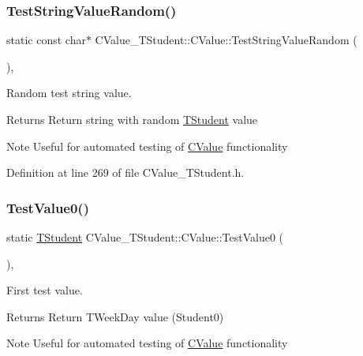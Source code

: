 \subsubsection{\texorpdfstring{Test\+String\+Value\+Random()}{TestStringValueRandom()}}
{\footnotesize\ttfamily static const char$\ast$ C\+Value\+\_\+\+T\+Student\+::\+C\+Value\+::\+Test\+String\+Value\+Random (\begin{DoxyParamCaption}{ }\end{DoxyParamCaption})\hspace{0.3cm}{\ttfamily [inline]}, {\ttfamily [static]}}



Random test string value. 

\begin{DoxyReturn}{Returns}
Return string with random \hyperlink{struct_c_value___t_student_1_1_t_student}{T\+Student} value 
\end{DoxyReturn}
\begin{DoxyNote}{Note}
Useful for automated testing of \hyperlink{class_c_value___t_student_1_1_c_value}{C\+Value} functionality 
\end{DoxyNote}


Definition at line 269 of file C\+Value\+\_\+\+T\+Student.\+h.

\mbox{\label{class_c_value___t_student_1_1_c_value_a7e1c9e64ef5c8428df0fd56772d1240e}} 
\subsubsection{\texorpdfstring{Test\+Value0()}{TestValue0()}}
{\footnotesize\ttfamily static \hyperlink{struct_c_value___t_student_1_1_t_student}{T\+Student} C\+Value\+\_\+\+T\+Student\+::\+C\+Value\+::\+Test\+Value0 (\begin{DoxyParamCaption}{ }\end{DoxyParamCaption})\hspace{0.3cm}{\ttfamily [inline]}, {\ttfamily [static]}}



First test value. 

\begin{DoxyReturn}{Returns}
Return T\+Week\+Day value (Student0) 
\end{DoxyReturn}
\begin{DoxyNote}{Note}
Useful for automated testing of \hyperlink{class_c_value___t_student_1_1_c_value}{C\+Value} functionality 
\end{DoxyNote}


